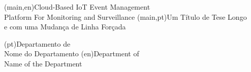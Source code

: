 
%


\nttitle(main,en){Cloud-Based IoT Event Management \\Platform For Monitoring and Surveillance}%
\nttitle(main,pt){Um Título de Tese Longo\\e com uma Mudança de Linha Forçada}%



\ntdepartment*(pt){Departamento de\\Nome do Departamento}
\ntdepartment*(en){Department of\\Name of the Department}

